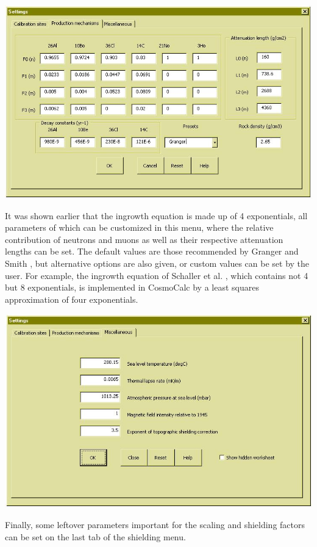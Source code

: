 \documentclass[12pt]{article}
\begin{document}
\begin{minipage}[tbp]{\textwidth}
  \begin{center}
  \includegraphics[width=.65\textwidth]{settingsProdMech.jpg}\\
  \end{center}
  It was  shown earlier  that the  ingrowth equation is  made up  of 4
  exponentials,  all parameters  of which  can be  customized  in this
  menu, where the relative contribution  of neutrons and muons as well
  as  their respective attenuation  lengths can  be set.   The default
  values    are    those   recommended    by    Granger   and    Smith
  \cite{granger2000},  but  alternative  options  are also  given,  or
  custom values  can be  set by the  user.  For example,  the ingrowth
  equation of Schaller et  al. \cite{schaller2002}, which contains not
  4 but 8 exponentials, is implemented in CosmoCalc by a least squares
  approximation of four exponentials.
  \\
\end{minipage}

\begin{minipage}[tbp]{\textwidth}
  \begin{center}
   \includegraphics[width=.65\textwidth]{settingsMisc.jpg}\\
  \end{center}
  Finally,  some leftover  parameters  important for  the scaling  and
  shielding factors can be set on  the last tab of the shielding menu.
\\
\end{minipage}
\end{document}
